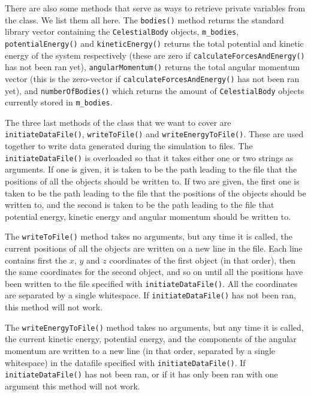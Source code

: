 \documentclass[reprint,english,notitlepage]{revtex4-1}  %
\begin{document}
There are also some methods that serve as ways to retrieve private variables from the class. We list them all here. The \verb+bodies()+ method returns the standard library vector containing the \verb+CelestialBody+ objects, \verb+m_bodies+, \verb+potentialEnergy()+ and \verb+kineticEnergy()+ returns the total potential and kinetic energy of the system respectively (these are zero if \verb+calculateForcesAndEnergy()+ has not been ran yet), \verb+angularMomentum()+ returns the total angular momentum vector (this is the zero-vector if \verb+calculateForcesAndEnergy()+ has not been ran yet), and \verb+numberOfBodies()+ which returns the amount of \verb+CelestialBody+ objects currently stored in \verb+m_bodies+.  

The three last methods of the class that we want to cover are \verb+initiateDataFile()+, \verb+writeToFile()+ and \verb+writeEnergyToFile()+. These are used together to write data generated during the simulation to files. The \verb+initiateDataFile()+ is overloaded so that it takes either one or two strings as arguments. If one is given, it is taken to be the path leading to the file that the positions of all the objects should be written to. If two are given, the first one is taken to be the path leading to the file that the positions of the objects should be written to, and the second is taken to be the path leading to the file that potential energy, kinetic energy and angular momentum should be written to. \newline

\label{poi:write_to_file}
The \verb+writeToFile()+ method takes no arguments, but any time it is called, the current positions of all the objects are written on a new line in the file. Each line contains first the $x$, $y$ and $z$ coordinates of the first object (in that order), then the same coordinates for the second object, and so on until all the positions have been written to the file specified with \verb+initiateDataFile()+. All the coordinates are separated by a single whitespace. If \verb+initiateDataFile()+ has not been ran, this method will not work. \newline

\label{poi:write_energy_to_file}
The \verb+writeEnergyToFile()+ method takes no arguments, but any time it is called, the current kinetic energy, potential energy, and the components of the angular momentum are written to a new line (in that order, separated by a single whitespace) in the datafile specified with \verb+initiateDataFile()+. If \verb+initiateDataFile()+ has not been ran, or if it has only been ran with one argument this method will not work.
\end{document}
